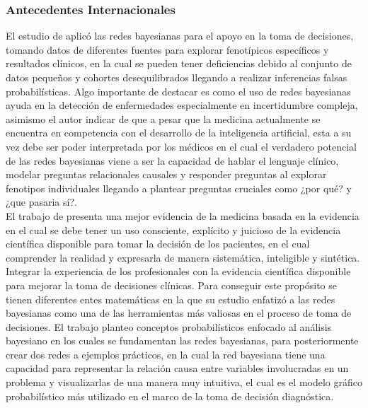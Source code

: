 \subsubsection{Antecedentes Internacionales}
El estudio de \cite{waddell2023applying} aplicó las redes bayesianas para el apoyo en la toma de decisiones, tomando datos de diferentes fuentes para explorar fenotípicos específicos y resultados clínicos, en la cual se pueden tener deficiencias debido al conjunto de datos pequeños y cohortes desequilibrados llegando a realizar inferencias falsas probabilísticas. Algo importante de destacar es como el uso de redes bayesianas ayuda en la detección de enfermedades especialmente en incertidumbre compleja, asimismo el autor indicar de que a pesar que la medicina actualmente se encuentra en competencia con el desarrollo de la inteligencia artificial, esta a su vez debe ser poder interpretada por los médicos en el cual el verdadero potencial de las redes bayesianas viene a ser la capacidad de hablar el lenguaje clínico, modelar preguntas relacionales causales y responder preguntas al explorar fenotipos individuales llegando a plantear preguntas cruciales como ¿por qué? y ¿que pasaria sí?. \\

El trabajo de \cite{ferez2017redes} presenta una mejor evidencia de la medicina basada en la evidencia en el cual se debe tener un uso consciente, explícito y juicioso de la evidencia científica disponible para tomar la decisión de los pacientes, en el cual comprender la realidad y expresarla de manera sistemática, inteligible y sintética. Integrar la experiencia de los profesionales con la evidencia científica disponible para mejorar la toma de decisiones clínicas. Para conseguir este propósito se tienen diferentes entes matemáticas en la que su estudio enfatizó a las redes bayesianas como una de las herramientas más valiosas en el proceso de toma de decisiones. El trabajo planteo conceptos probabilísticos enfocado al análisis bayesiano en los cuales se fundamentan las redes bayesianas, para posteriormente crear dos redes a ejemplos prácticos, en la cual la red bayesiana tiene una capacidad para representar la relación causa entre variables involucradas en un problema y visualizarlas de una manera muy intuitiva, el cual es el modelo gráfico probabilístico más utilizado en el marco de la toma de decisión diagnóstica.

